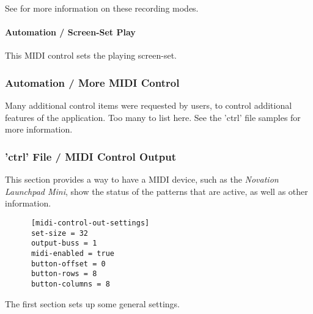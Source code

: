    See  for more information on these
   recording modes.

\paragraph{Automation / Screen-Set Play}
\label{paragraph:configuration_midi_ctrl_ssplay}

This MIDI control sets the playing screen-set.

\subsubsection{Automation / More MIDI Control}
\label{subsubsec:configuration_midi_ctrl_automationex}

   Many additional control items were requested by users, to control
   additional features of the application.  Too many to list here.
   See the 'ctrl' file samples for more information.

\subsubsection{'ctrl' File / MIDI Control Output}
\label{subsubsec:configuration_ctrl_midi_control_out}

   This section provides a way to have a MIDI device, such as the
   \textsl{Novation Launchpad Mini}, show the status
   of the patterns that are active, as well as other information.

   \begin{verbatim}
      [midi-control-out-settings]
      set-size = 32
      output-buss = 1
      midi-enabled = true
      button-offset = 0
      button-rows = 8
      button-columns = 8
   \end{verbatim}

   The first section sets up some general settings.

